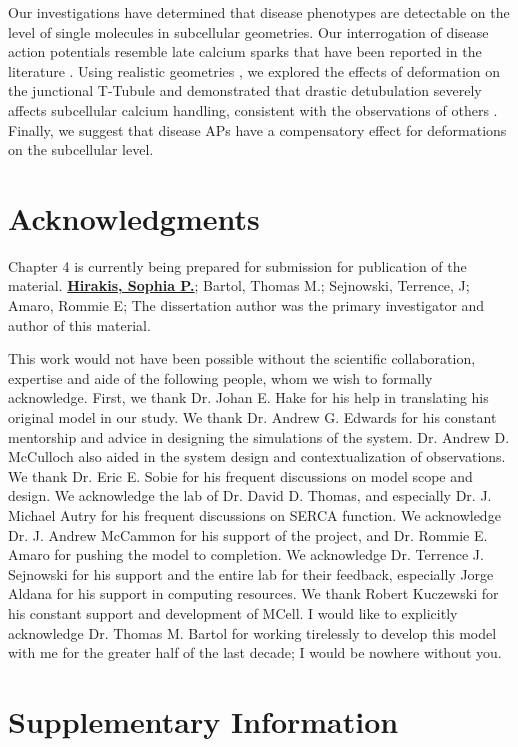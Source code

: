 \documentclass[12pt]{ucsddissertation}
\begin{document}
Our investigations have determined that disease phenotypes are detectable on the level of single molecules in subcellular geometries. Our interrogation of disease action potentials resemble late calcium sparks that have been reported in the literature \cite{Fowler2017}. Using realistic geometries \cite{Hayashi2009}, we explored the effects of deformation on the junctional T-Tubule and demonstrated that drastic detubulation severely affects subcellular calcium handling, consistent with the observations of others \cite{Crossman2015,Louch2010}. Finally, we suggest that disease APs have a compensatory effect for deformations on the subcellular level.

\section{Acknowledgments}

Chapter 4 is currently being prepared for submission for
publication of the material. \textbf{\underline{Hirakis, Sophia P.}};  Bartol, Thomas M.; Sejnowski, Terrence, J; Amaro, Rommie E; The dissertation author was the primary investigator and author of this material.

This work would not have been possible without the scientific collaboration, expertise and aide of the following people, whom we wish to formally acknowledge. First, we thank Dr. Johan E. Hake for his help in translating his original model in our study. We thank Dr. Andrew G. Edwards for his constant mentorship and advice in designing the simulations of the system. Dr. Andrew D. McCulloch also aided in the system design and contextualization of observations. We thank Dr. Eric E. Sobie for his frequent discussions on model scope and design. We acknowledge the lab of Dr. David D. Thomas, and especially Dr. J. Michael Autry for his frequent discussions on SERCA function. We acknowledge Dr. J. Andrew McCammon for his support of the project, and Dr. Rommie E. Amaro for pushing the model to completion. We acknowledge Dr. Terrence J. Sejnowski for his support and the entire lab for their feedback, especially Jorge Aldana for his support in computing resources. We thank Robert Kuczewski for his constant support and development of MCell.  I would like to explicitly acknowledge Dr. Thomas M. Bartol for working tirelessly to develop this model with me for the greater half of the last decade; I would be nowhere without you. 

 \section{Supplementary Information}
 
\end{document}
